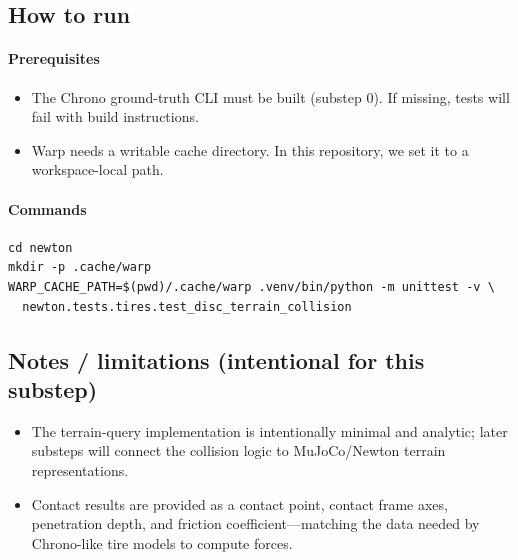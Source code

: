 \subsection{How to run}
\paragraph{Prerequisites}
\begin{itemize}
  \item The Chrono ground-truth CLI must be built (substep 0). If missing, tests will fail with build instructions.
  \item Warp needs a writable cache directory. In this repository, we set it to a workspace-local path.
\end{itemize}

\paragraph{Commands}
\begin{verbatim}
cd newton
mkdir -p .cache/warp
WARP_CACHE_PATH=$(pwd)/.cache/warp .venv/bin/python -m unittest -v \
  newton.tests.tires.test_disc_terrain_collision
\end{verbatim}

\subsection{Notes / limitations (intentional for this substep)}
\begin{itemize}
  \item The terrain-query implementation is intentionally minimal and analytic; later substeps will connect the
        collision logic to MuJoCo/Newton terrain representations.
  \item Contact results are provided as a contact point, contact frame axes, penetration depth, and friction
        coefficient---matching the data needed by Chrono-like tire models to compute forces.
\end{itemize}
